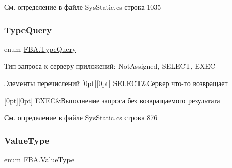 См. определение в файле Sys\+Static.\+cs строка 1035

\mbox{\label{namespace_f_b_a_ae3e8e3cf257baeeb6f393380f9abe802}} 
\subsubsection{\texorpdfstring{Type\+Query}{TypeQuery}}
{\footnotesize\ttfamily enum \mbox{\hyperlink{namespace_f_b_a_ae3e8e3cf257baeeb6f393380f9abe802}{F\+B\+A.\+Type\+Query}}\hspace{0.3cm}{\ttfamily [strong]}}



Тип запроса к серверу приложений\+: Not\+Assigned, S\+E\+L\+E\+CT, E\+X\+EC 

\begin{DoxyEnumFields}{Элементы перечислений}
[0pt][0pt]{}\mbox{\label{namespace_f_b_a_ae3e8e3cf257baeeb6f393380f9abe802a63225f19fccb18e7c709f1fa11bc738e}} 
S\+E\+L\+E\+CT&Сервер что-\/то возвращает \\
\hline

[0pt][0pt]{}\mbox{\label{namespace_f_b_a_ae3e8e3cf257baeeb6f393380f9abe802af28b3aad7d43b371527fde69de8d93ff}} 
E\+X\+EC&Выполнение запроса без возвращаемого результата \\
\hline

\end{DoxyEnumFields}


См. определение в файле Sys\+Static.\+cs строка 876

\mbox{\label{namespace_f_b_a_a940b390561ecfbdb6e1606ec1711bd59}} 
\subsubsection{\texorpdfstring{Value\+Type}{ValueType}}
{\footnotesize\ttfamily enum \mbox{\hyperlink{namespace_f_b_a_a940b390561ecfbdb6e1606ec1711bd59}{F\+B\+A.\+Value\+Type}}\hspace{0.3cm}{\ttfamily [strong]}}



